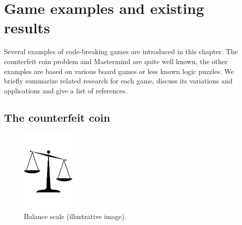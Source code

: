 \chapter[Examples of code-breaking games and existing results]{Game examples and existing results} \label{ch:games}
Several examples of code-breaking games are introduced in this chapter.
The counterfeit coin problem and Mastermind are quite well known,
  the other examples are based on various board games or less known
  logic puzzles.
We briefly summarize related research for each game, discuss
  its variations and applications and give a list of
  references.


\section{The counterfeit coin} \label{s:coins}

\begin{figure}
  \begin{center}
  \vspace{-5mm}
  \includegraphics[width=0.23\textwidth]{pictures/scales.pdf}
  \vspace{-5mm}
  \end{center}
  \caption{Balance scale (illustrative image)\protect\footnotemark.}
  \vspace{-10mm}
\end{figure}

